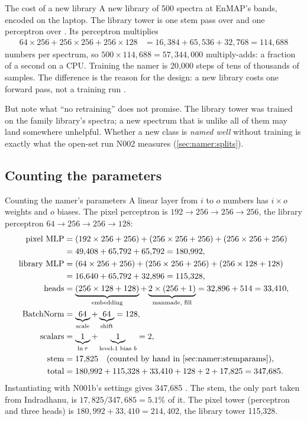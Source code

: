\begin{worked}[label={we:namer:newlib}]{The cost of a new library}
A new library of 500 spectra at EnMAP's bands, encoded on the laptop. The library tower is one stem pass over
 and one perceptron over . Its perceptron multiplies
\begin{align*}
64\times256+256\times256+256\times128 &= 16{,}384+65{,}536+32{,}768 = 114{,}688
\end{align*}
numbers per spectrum, so $500\times114{,}688=57{,}344{,}000$ multiply-adds: a fraction of a second on a CPU. Training
the namer is 20,000 steps of tens of thousands of samples. The difference is the reason for the design: a new library
costs one forward pass, not a training run \tagC.
\end{worked}

But note what ``no retraining'' does not promise. The library tower was trained on the family library's spectra; a new
spectrum that is unlike all of them may land somewhere unhelpful. Whether a new class is \emph{named well} without
training is exactly what the open-set run N002 measures (\cref{sec:namer:splits}).

\subsection{Counting the parameters}

\begin{worked}[label={we:namer:params}]{Counting the namer's parameters}
A linear layer from $i$ to $o$ numbers has $i\times o$ weights and $o$ biases. The pixel perceptron is
$192\to256\to256\to256$, the library perceptron $64\to256\to256\to128$:
\begin{align*}
\text{pixel MLP} &= (192\times256+256)+(256\times256+256)+(256\times256+256)\\
&= 49{,}408+65{,}792+65{,}792 = 180{,}992,\\
\text{library MLP} &= (64\times256+256)+(256\times256+256)+(256\times128+128)\\
&= 16{,}640+65{,}792+32{,}896 = 115{,}328,\\
\text{heads} &= \underbrace{(256\times128+128)}_{\text{embedding}}+\underbrace{2\times(256+1)}_{\text{manmade, fill}}
 = 32{,}896+514 = 33{,}410,\\
\text{BatchNorm} &= \underbrace{64}_{\text{scale}}+\underbrace{64}_{\text{shift}} = 128,\\
\text{scalars} &= \underbrace{1}_{\ln\tau}+\underbrace{1}_{\text{level-1 bias }b} = 2,\\
\text{stem} &= 17{,}825 \quad\text{(counted by hand in \cref{sec:namer:stemparams})},\\
\text{total} &= 180{,}992+115{,}328+33{,}410+128+2+17{,}825 = 347{,}685 .
\end{align*}
Instantiating  with N001b's settings gives 347,685 \tagC. The stem, the only part taken from
Indradhanu, is $17{,}825/347{,}685=5.1\%$ of it. The pixel tower (perceptron and three heads) is
$180{,}992+33{,}410=214{,}402$, the library tower 115,328.
\end{worked}

